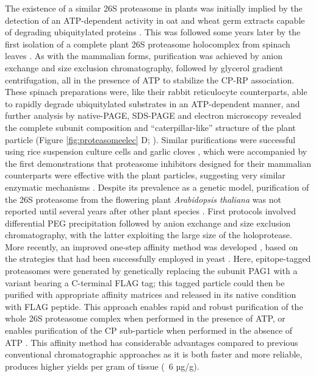 	The existence of a similar 26S proteasome in plants was initially implied by the detection of an ATP-dependent activity in oat and wheat germ extracts capable of degrading ubiquitylated proteins \citep{hatfield89, vierstra88}.  This was followed some years later by the first isolation of a complete plant 26S proteasome holocomplex from spinach leaves \citep{fujinami94}.  As with the mammalian forms, purification was achieved by anion exchange and size exclusion chromatography, followed by glycerol gradient centrifugation, all in the presence of ATP to stabilize the CP-RP association.  These spinach preparations were, like their rabbit reticulocyte counterparts, able to rapidly degrade ubiquitylated substrates in an ATP-dependent manner, and further analysis by native-PAGE, SDS-PAGE and electron microscopy revealed the complete subunit composition and ``caterpillar-like'' structure of the plant particle (Figure \ref{fig:proteasomeelec} D; \citep{fujinami94}).  Similar purifications were successful using rice suspension culture cells and garlic cloves \citep{malik04, yanagawa99}, which were accompanied by the first demonstrations that proteasome inhibitors designed for their mammalian counterparts were effective with the plant particles, suggesting very similar enzymatic mechanisms \citep{ozaki92, woffenden98}.
	Despite its prevalence as a genetic model, purification of the 26S proteasome from the flowering plant \textit{Arabidopsis thaliana} was not reported until several years after other plant species \citep{yang04}.  First protocols involved differential PEG precipitation followed by anion exchange and size exclusion chromatography, with the latter exploiting the large size of the holoprotease.  More recently, an improved one-step affinity method was developed \citep{book10}, based on the strategies that had been successfully employed in yeast \citep{leggett05}.  Here, epitope-tagged proteasomes were generated by genetically replacing the subunit PAG1 with a variant bearing a C-terminal FLAG tag; this tagged particle could then be purified with appropriate affinity matrices and released in its native condition with FLAG peptide.  This approach enables rapid and robust purification of the whole 26S proteasome complex when performed in the presence of ATP, or enables purification of the CP sub-particle when performed in the absence of ATP \citep{book10}. This affinity method has considerable advantages compared to previous conventional chromatographic approaches \citep{yang04} as it is both faster and more reliable, produces higher yields per gram of tissue (~6 µg/g). 
